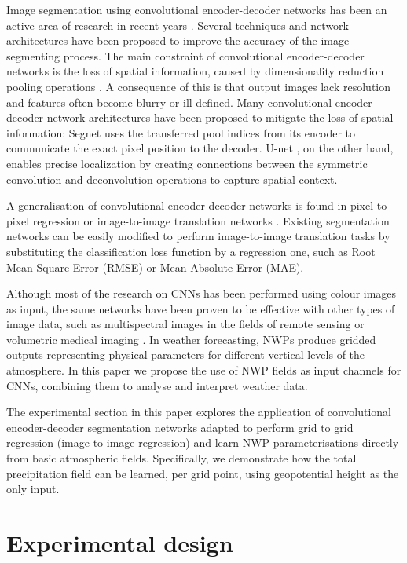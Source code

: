 \documentclass[twocol]{ametsoc}
\begin{document}
Image segmentation using convolutional encoder-decoder networks has been an active area of research in recent years \citep{krizhevsky2012imagenet,chen2018deeplab}. Several techniques and network architectures have been proposed to improve the accuracy of the image segmenting process. The main constraint of convolutional encoder-decoder networks is the loss of spatial information, caused by dimensionality reduction pooling operations \citep{scherer2010evaluation}. A consequence of this is that output images lack resolution and features often become blurry or ill defined. Many convolutional encoder-decoder network architectures have been proposed to mitigate the loss of spatial information: Segnet \citep{badrinarayanan2017segnet} uses the transferred pool indices from its encoder to communicate the exact pixel position to the decoder. U-net \citep{ronneberger2015u}, on the other hand, enables precise localization by creating connections between the symmetric convolution and deconvolution operations to capture spatial context. 

A generalisation of convolutional encoder-decoder networks is found in pixel-to-pixel regression or image-to-image translation networks \citep{isola2017image}. Existing segmentation networks can be easily modified to perform image-to-image translation tasks by substituting the classification loss function by a regression one, such as Root Mean Square Error (RMSE) or Mean Absolute Error (MAE).

Although most of the research on CNNs has been performed using colour images as input, the same networks have been proven to be effective with other types of image data, such as multispectral images in the fields of remote sensing \citep{hu2015transferring} or volumetric medical imaging \citep{milletari2016v}. In weather forecasting, NWPs produce gridded outputs representing physical parameters for different vertical levels of the atmosphere. In this paper we propose the use of NWP fields as input channels for CNNs, combining them to analyse and interpret weather data.

The experimental section in this paper explores the application of convolutional encoder-decoder segmentation networks adapted to perform grid to grid regression (image to image regression) and learn NWP parameterisations directly from basic atmospheric fields. Specifically, we demonstrate how the total precipitation field can be learned, per grid point, using geopotential height as the only input.


\section{Experimental design}
\end{document}
